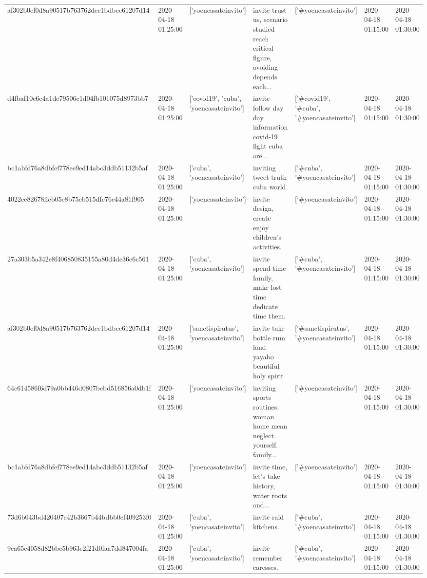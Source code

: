 \begin{tabular}{lllllll}
af302b0ef0d8a90517b763762dec1bdbcc61207d14 & 2020-04-18 01:25:00 & ['yoencasateinvito'] & invite trust us, scenario studied reach critical figure, avoiding depends each... & ['#yoencasateinvito'] & 2020-04-18 01:15:00 & 2020-04-18 01:30:00 \\
d4fbaf10c6c4a1de79506c1d04fb101075d8973bb7 & 2020-04-18 01:25:00 & ['covid19', 'cuba', 'yoencasateinvito'] & invite follow day day information covid-19 fight cuba are... & ['#covid19', '#cuba', '#yoencasateinvito'] & 2020-04-18 01:15:00 & 2020-04-18 01:30:00 \\
bc1abfd76a8dbfef778ee9ed14abc3ddb51132b5af & 2020-04-18 01:25:00 & ['cuba', 'yoencasateinvito'] & inviting tweet truth cuba world. & ['#cuba', '#yoencasateinvito'] & 2020-04-18 01:15:00 & 2020-04-18 01:30:00 \\
4022ee82678ffcb05e8b75eb515dfc76e44a81f905 & 2020-04-18 01:25:00 & ['yoencasateinvito'] & invite design, create enjoy children's activities. & ['#yoencasateinvito'] & 2020-04-18 01:15:00 & 2020-04-18 01:30:00 \\
27a303b5a342e8f406850835155a80d4dc36e6c561 & 2020-04-18 01:25:00 & ['cuba', 'yoencasateinvito'] & invite spend time family, make lost time dedicate time them. & ['#cuba', '#yoencasateinvito'] & 2020-04-18 01:15:00 & 2020-04-18 01:30:00 \\
af302b0ef0d8a90517b763762dec1bdbcc61207d14 & 2020-04-18 01:25:00 & ['sanctispírutus', 'yoencasateinvito'] & invite take bottle rum land yayabo beautiful holy spirit & ['#sanctispírutus', '#yoencasateinvito'] & 2020-04-18 01:15:00 & 2020-04-18 01:30:00 \\
64c614586f6d79a0bb446d0807bebd516856a0db1f & 2020-04-18 01:25:00 & ['yoencasateinvito'] & inviting sports routines. woman home mean neglect yourself. family... & ['#yoencasateinvito'] & 2020-04-18 01:15:00 & 2020-04-18 01:30:00 \\
bc1abfd76a8dbfef778ee9ed14abc3ddb51132b5af & 2020-04-18 01:25:00 & ['yoencasateinvito'] & invite time, let's take history, water roots and... & ['#yoencasateinvito'] & 2020-04-18 01:15:00 & 2020-04-18 01:30:00 \\
73d6b043bd420407e42b3667b44bdbb0cf409253f0 & 2020-04-18 01:25:00 & ['cuba', 'yoencasateinvito'] & invite raid kitchens. & ['#cuba', '#yoencasateinvito'] & 2020-04-18 01:15:00 & 2020-04-18 01:30:00 \\
9ca65c4058d82bbc5b963e2f21d0faa7dd847004fa & 2020-04-18 01:25:00 & ['cuba', 'yoencasateinvito'] & invite remember caresses. & ['#cuba', '#yoencasateinvito'] & 2020-04-18 01:15:00 & 2020-04-18 01:30:00 \\

\end{tabular}
